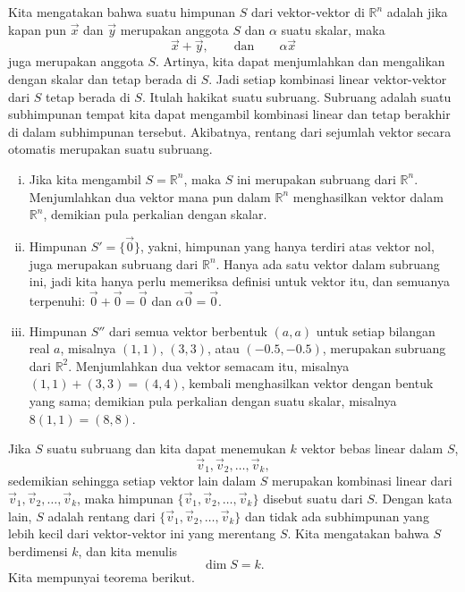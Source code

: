 Kita mengatakan bahwa suatu himpunan $S$ dari vektor-vektor di ${\mathbb R}^n$ adalah
\emph{} jika
kapan pun $\vec{x}$ dan $\vec{y}$ merupakan anggota $S$ dan
$\alpha$ suatu skalar, maka
\begin{equation*}
\vec{x} + \vec{y}, \qquad \text{dan} \qquad \alpha \vec{x}
\end{equation*}
juga merupakan anggota $S$. Artinya, kita dapat menjumlahkan dan mengalikan dengan skalar
dan tetap berada di $S$. Jadi setiap kombinasi linear vektor-vektor dari
$S$ tetap berada di $S$. Itulah hakikat suatu subruang. Subruang adalah suatu subhimpunan
tempat kita dapat mengambil kombinasi linear dan tetap berakhir di dalam subhimpunan tersebut.
Akibatnya, rentang dari sejumlah vektor secara otomatis merupakan suatu subruang.

\begin{example} \label{example:simplesubspaces}
\begin{enumerate}[(i)]
\item
Jika kita mengambil $S = {\mathbb R}^n$, maka $S$ ini merupakan subruang dari
${\mathbb R}^n$. Menjumlahkan dua vektor mana pun dalam ${\mathbb R}^n$ menghasilkan vektor dalam
${\mathbb R}^n$, demikian pula perkalian dengan skalar.
\item
Himpunan $S' = \{ \vec{0} \}$, yakni,
himpunan yang hanya terdiri atas vektor nol, juga
merupakan subruang dari ${\mathbb R}^n$. Hanya ada satu vektor dalam
subruang ini, jadi kita hanya perlu memeriksa definisi untuk vektor itu, dan semuanya terpenuhi:
$\vec{0}+\vec{0} = \vec{0}$ dan $\alpha \vec{0} = \vec{0}$.
\item
Himpunan $S''$ dari semua vektor berbentuk
$(a,a)$ untuk setiap bilangan real $a$, misalnya $(1,1)$, $(3,3)$, atau $(-0.5,-0.5)$,
merupakan subruang dari ${\mathbb R}^2$. Menjumlahkan dua vektor semacam itu, misalnya
$(1,1)+(3,3) = (4,4)$, kembali menghasilkan vektor dengan bentuk yang sama; demikian pula
perkalian dengan suatu skalar, misalnya $8(1,1) = (8,8)$.
\end{enumerate}
\end{example}

Jika $S$ suatu subruang dan kita dapat menemukan $k$ vektor bebas linear dalam $S$,
\begin{equation*}
\vec{v}_1, \vec{v}_2, \ldots, \vec{v}_k ,
\end{equation*}
sedemikian sehingga setiap vektor lain dalam $S$ merupakan kombinasi linear dari $\vec{v}_1,
\vec{v}_2,\ldots, \vec{v}_k$,
maka himpunan
$\{ \vec{v}_1, \vec{v}_2, \ldots, \vec{v}_k \}$ disebut suatu
\emph{} dari $S$. Dengan kata lain, $S$
adalah rentang dari
$\{ \vec{v}_1, \vec{v}_2, \ldots, \vec{v}_k \}$
dan tidak ada subhimpunan yang lebih kecil dari vektor-vektor ini yang merentang $S$.
Kita mengatakan bahwa $S$ berdimensi $k$,
dan kita menulis
\begin{equation*}
\dim S = k .
\end{equation*}
Kita mempunyai teorema berikut.

